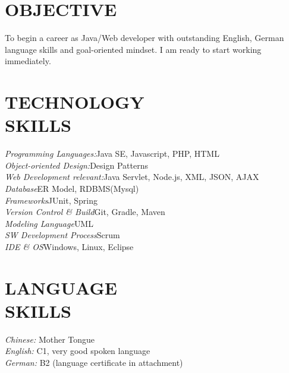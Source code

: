 \documentclass[margin, 10pt]{res} %
\begin{document}
\begin{resume}

 
\section{OBJECTIVE}  

To begin a career as Java/Web developer with outstanding English, German language skills and goal-oriented mindset. I am ready to start working immediately.

\section{TECHNOLOGY \\ SKILLS} 

{\sl Programming Languages:}\hfill		Java SE, Javascript, PHP, HTML\\
{\sl Object-oriented Design:}\hfill 		Design Patterns\\
{\sl Web Development relevant:}\hfill 	Java Servlet, Node.js, XML, JSON, AJAX\\
{\sl Database}\hfill 						ER Model, RDBMS(Mysql)\\ 
{\sl Frameworks}\hfill  					JUnit, Spring\\
{\sl Version Control \& Build}\hfill 	Git, Gradle, Maven\\
{\sl Modeling Language}\hfill 				UML\\
{\sl SW Development Process}\hfill 		Scrum\\
{\sl IDE \& OS}\hfill  					Windows, Linux, Eclipse


\section{LANGUAGE \\ SKILLS} 
{\sl Chinese:} 		Mother Tongue \\
{\sl English:} 		C1, very good spoken language\\
{\sl German:} 		B2 (language certificate in attachment)


\end{resume}
\end{document}
